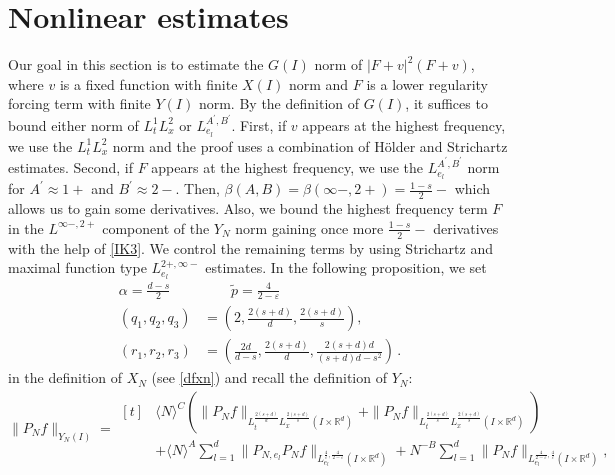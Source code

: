\documentclass[aihp]{imsart}
\numberwithin{equation}{section}
\theoremstyle{plain}
\theoremstyle{remark}
\newcommand{\R}{\mathbb{R}}
\begin{document}
\section{Nonlinear estimates}\label{sec:nonlin}
Our goal in this section is to estimate the $G (I)$ norm of $|F+v|^2 (F+v)$, where $v$ is a fixed function 
with finite $X(I)$ norm and $F$ is a lower regularity forcing term with finite $Y(I)$ norm. By  the definition of $G(I)$, it suffices to
bound either norm of $L^1_t L^2_x$ or $L_{e_l}^{A^\prime,B^\prime}$. 
First, if $v$ appears at the 
highest frequency, we  use the $L^1_t L^2_x$ norm and the proof uses a combination of H\" older and Strichartz estimates. Second, if $F$ appears at the highest frequency, 
we  use the $L_{e_l}^{A^\prime,B^\prime}$ norm for $A^\prime\approx 1+$ and $B^\prime\approx 2-$. Then, 
$\beta (A,B)=\beta (\infty- , 2+)= \frac{1-s}{2}-$ which allows us to  gain some derivatives. Also, we bound the highest frequency term $F$ in the $L^{\infty- ,2+}$ component of the $Y_N$ norm 
gaining once more $ \frac{1-s}{2}-$ derivatives with the help of \eqref{IK3}. We control the remaining terms by using Strichartz and maximal function type $L_{e_l}^{2+,\infty-}$ estimates. 
In the following proposition, we set 
\begin{equation}\label{parms}
\begin{aligned}
\alpha = \frac{d - s}{2} &\qquad \tilde{p} = \frac{4}{2 - \varepsilon} \\
(q_1, q_2, q_3) &= \left(2, \frac{2(s+d)}{d}, \frac{2(s+d)}{s}\right), \\
 (r_1, r_2, r_3) &= \left(\frac{2d}{d-s}, \frac{2(s+d)}{d}, \frac{2(s+d)d}{(s+d)d - s^2}\right) \,.
\end{aligned}
\end{equation}
in the definition of  $X_N$ (see \eqref{dfxn})
and recall the definition of $Y_N$: 
\begin{equation*}
\|P_N f\|_{Y_N(I)}=\begin{aligned}[t]
& \langle N\rangle^C \left(\|P_N f\|_{L_t^{\frac{2(s+d)}{d}} L_x^{\frac{2(s+d)}{s}} (I\times \R^d)} +\|P_N f\|_{L_t^{\frac{2(s+d)}{s}} L_x^{\frac{2(s+d)}{s}}(I\times \R^d) } \right)\\
&+\langle N\rangle^A \sum_{l=1}^d \|P_{N,e_l} P_N f \|_{L^{\frac{4}{\varepsilon},\frac{4}{2-\varepsilon}}_{e_l}(I\times \R^d) } +N^{-B} \sum_{l=1}^d \|P_N f\|_{L^{\frac{4}{2-\varepsilon},\frac{4}{\varepsilon}}_{e_l} (I\times \R^d) },  
\end{aligned}
\end{equation*}
\end{document}
